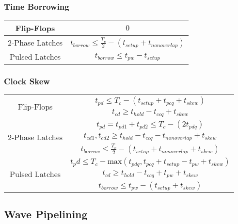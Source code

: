 \documentclass{../formulae}
\begin{document}
\begin{multicols*}{2}
            \subsubsection{Time Borrowing}
            \begin{tabular}{| c | c |}
                \hline
                Flip-Flops & $0$ \\
                \hline
                2-Phase Latches & $t_{borrow} \leq \frac{T_c}{2} - (t_{setup} + t_{nonoverlap})$ \\
                \hline
                Pulsed Latches & $t_{borrow} \leq t_{pw} - t_{setup}$ \\
                \hline
            \end{tabular}

            \subsubsection{Clock Skew}
            \begin{tabular}{| c | c |}
                \hline
                \multirow{2}{4em}{Flip-Flops} & $t_{pd} \leq T_c - (t_{setup} + t_{pcq} + t_{skew})$ \\
                & $t_{cd} \geq t_{hold} - t_{ccq} + t_{skew}$\\
                \hline
                \multirow{3}{4em}{2-Phase Latches} & $t_{pd} = t_{pd1} + t_{pd2} \leq T_c - (2t_{pdq})$ \\
                & $t_{cd1},t_{cd2} \geq t_{hold} - t_{ccq} - t_{nonoverlap} + t_{skew}$\\
                & $t_{borrow} \leq \frac{T_c}{2} - (t_{setup} + t_{nonoverlap} + t_{skew})$\\
                \hline
                \multirow{3}{4em}{Pulsed Latches} & $t_pd \leq T_c - \text{max}\left( t_{pdq}, t_{pcq} + t_{setup} - t_{pw} + t_{skew}\right)$ \\
                & $t_{cd} \geq t_{hold} - t_{ccq} + t_{pw} + t_{skew}$ \\
                & $t_{borrow} \leq t_{pw} - (t_{setup} +t_{skew})$\\
                \hline
            \end{tabular}
        \subsection{Wave Pipelining}

\end{multicols*}
\end{document}
